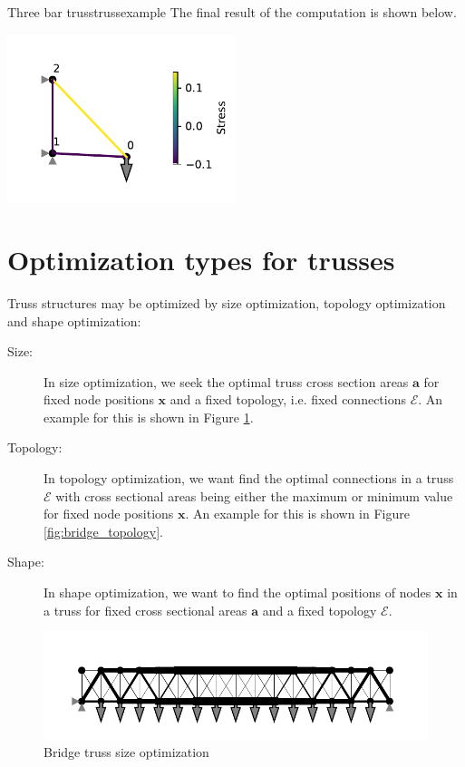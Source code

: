 \begin{example}{Three bar truss}{trussexample}
    The final result of the computation is shown below.
    
    \begin{center}
        \includegraphics[width=0.5\textwidth]{figures/three_bar_truss_solved.pdf}
    \end{center}    
\end{example}

\section{Optimization types for trusses}
Truss structures may be optimized by size optimization, topology optimization and shape optimization: 
\begin{description}
    \item[Size:]{In size optimization, we seek the optimal truss cross section areas $\mathbf{a}$ for fixed node positions $\mathbf{x}$ and a fixed topology, i.e. fixed connections $\mathcal{E}$. An example for this is shown in Figure \ref{fig:bridge_size}.} 
    \item[Topology:]{In topology optimization, we want find the optimal connections in a truss $\mathcal{E}$ with cross sectional areas being either the maximum or minimum value for fixed node positions $\mathbf{x}$. An example for this is shown in Figure \ref{fig:bridge_topology}.}
    \item[Shape:]{In shape optimization, we want to find the optimal positions of nodes $\mathbf{x}$ in a truss for fixed cross sectional areas $\mathbf{a}$ and a fixed topology $\mathcal{E}$.}
\end{description}

\begin{figure}[!ht]
    \centering
    \includegraphics[width=\textwidth]{figures/bridge_size_optimized.pdf}
    \caption{Bridge truss size optimization}
    \label{fig:bridge_size}
\end{figure}

